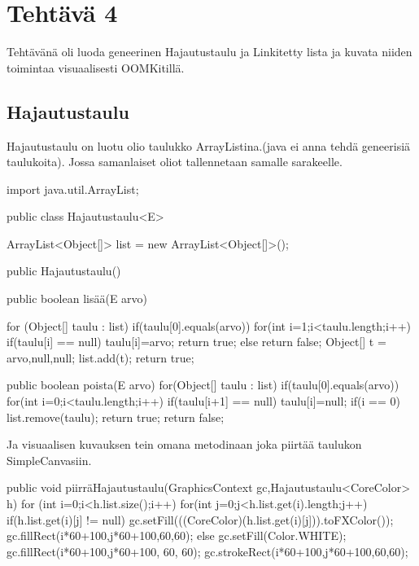 
\chapter{Tehtävä 4 \label{chap:Teht=0000E4v=0000E4-4}}

Tehtävänä oli luoda geneerinen Hajautustaulu ja Linkitetty lista ja kuvata niiden toimintaa visuaalisesti 
OOMKitillä. 

\section{Hajautustaulu}

\label{Hajautustaulu}

Hajautustaulu on luotu olio taulukko ArrayListina.(java ei anna tehdä geneerisiä taulukoita). 
Jossa samanlaiset oliot tallennetaan samalle sarakeelle. 
\label{Hajautustaulu}
\begin{javacode}
import java.util.ArrayList;


public class Hajautustaulu<E> {
	ArrayList<Object[]> list = new ArrayList<Object[]>();
	
	public Hajautustaulu() {
		 
	}
	public boolean lisää(E arvo) {
		for (Object[] taulu : list) {
			if(taulu[0].equals(arvo)) {
				for(int i=1;i<taulu.length;i++) {
					if(taulu[i] == null) {
						taulu[i]=arvo;
						return true;
					}else {
						return false;
					}
				}
			}
		}
		Object[] t = {arvo,null,null};
		list.add(t);
		return true;
		
	}
	public boolean poista(E arvo) {
		for(Object[] taulu : list) {
			if(taulu[0].equals(arvo)) {
				for(int i=0;i<taulu.length;i++) {
					if(taulu[i+1] == null) {
						taulu[i]=null;
						if(i == 0) {
							list.remove(taulu);
						}
						return true;
					}
				}
			}
		}
		return false;
	}
	
	
}

\end{javacode}

Ja visuaalisen kuvauksen tein omana metodinaan joka piirtää taulukon SimpleCanvasiin. 

\begin{javacode}
 public void piirräHajautustaulu(GraphicsContext gc,Hajautustaulu<CoreColor> h) {
            	for (int i=0;i<h.list.size();i++) {
           			for(int j=0;j<h.list.get(i).length;j++) {
           				if(h.list.get(i)[j] != null) {
           					gc.setFill(((CoreColor)(h.list.get(i)[j])).toFXColor());
            				gc.fillRect(i*60+100,j*60+100,60,60);
           				}else {
        					gc.setFill(Color.WHITE);
        					gc.fillRect(i*60+100,j*60+100, 60, 60);
        				}
        				gc.strokeRect(i*60+100,j*60+100,60,60);
        			}
        		}
           	}

\end{javacode}

